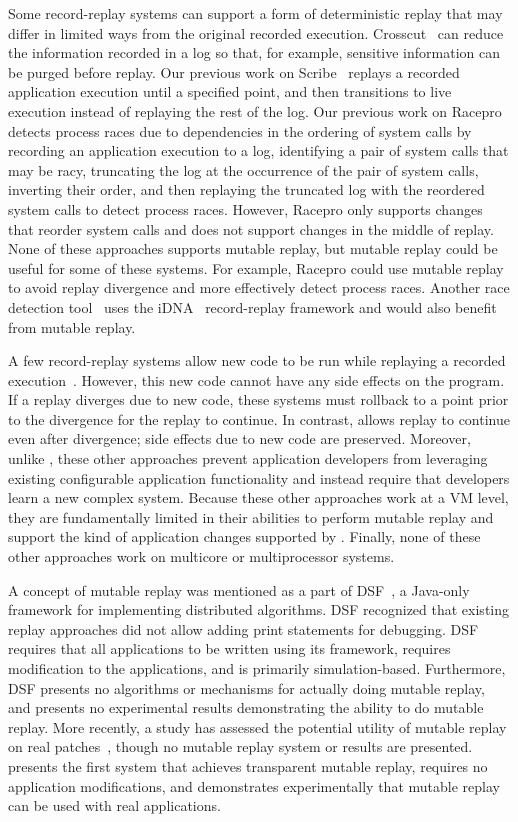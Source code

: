 Some record-replay systems can support a form of deterministic replay
that may differ in limited ways from the original recorded
execution. Crosscut~\cite{crosscut} can reduce the information
recorded in a log
so that, for example, sensitive information can be
purged before
replay. Our previous work on Scribe~\cite{scribe:sigmetrics10} replays a recorded
application execution until a specified
point, and then transitions to
live execution instead of replaying the rest of the
log. Our previous work on Racepro~\cite{racepro:sosp11} detects process races due to
dependencies in the ordering of system calls by recording an
application execution to a log, identifying a pair of system calls
that may be racy, truncating the log at the occurrence of the pair of
system calls, inverting their order, and then replaying the truncated
log with the reordered system calls to detect process
races.  However, Racepro only supports changes that reorder system calls and
does not support changes in the middle of replay.
None of these approaches supports mutable replay,
but mutable replay could be useful for some of these systems.  For
example, Racepro could use mutable replay to avoid replay
divergence and more effectively detect process races.  Another race
detection tool~\cite{pinsel:pldi07} uses the iDNA~\cite{idna:vee06}
record-replay framework and would also benefit from mutable replay.

A few record-replay systems allow new code to be run while replaying a recorded
execution~\cite{intrusions:sosp05,decouple:usenix08}. However, this new code
cannot have any side effects on the program.  If a replay diverges due to new
code, these systems must rollback to a point prior to the divergence for the
replay to continue.  In contrast, {\dora} allows replay to continue even
after divergence; side effects due to new code are preserved.  Moreover, unlike
{\dora}, these other approaches prevent application developers from leveraging existing
configurable application functionality and instead require that developers learn
a new complex system. Because these other approaches work at a VM level, they are
fundamentally limited in their abilities to perform mutable replay and support
the kind of application changes supported by {\dora}. Finally, none of these
other approaches work on multicore or multiprocessor systems.

A concept of mutable replay was mentioned as a part of
DSF~\cite{dsf}, a Java-only framework for implementing distributed 
algorithms. DSF recognized that existing replay approaches did not
allow adding print statements for debugging.  DSF requires that all
applications to be written using its framework, requires modification
to the applications, and is primarily simulation-based. Furthermore, DSF
presents no algorithms or mechanisms for actually doing mutable replay, and
presents no experimental results demonstrating the ability to do mutable
replay.  More recently, a study has assessed the potential utility of
mutable replay on real patches~\cite{mreplay-feas}, though no mutable
replay system or results are presented.
{\dora} presents the first system that achieves transparent mutable replay,
requires no application
modifications, and demonstrates experimentally that
mutable replay can be used with real applications.


